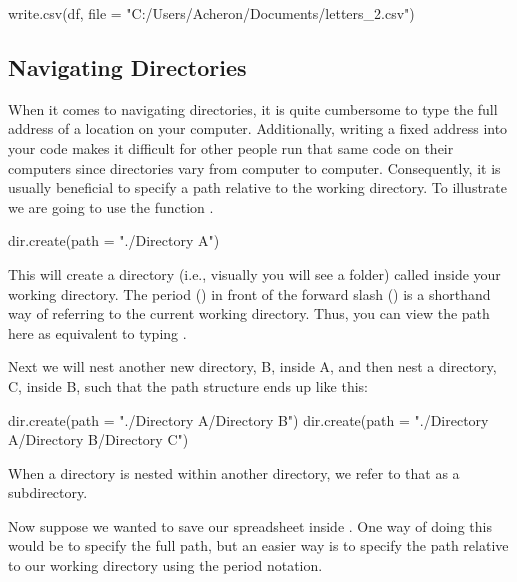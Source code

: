\begin{inR}
write.csv(df, file = "C:/Users/Acheron/Documents/letters_2.csv")
\end{inR}

\vspace{1em}

\subsection{Navigating Directories}

When it comes to navigating directories, it is quite cumbersome to type the full address of a location on your computer. Additionally, writing a fixed address into your code makes it difficult for other people run that same code on their computers since directories vary from computer to computer. Consequently, it is usually beneficial to specify a path relative to the working directory. To illustrate we are going to use the function .

\begin{inR}
dir.create(path = "./Directory A")
\end{inR}

\vspace{1em}

\noindent
This will create a directory (i.e., visually you will see a folder) called  inside your working directory. The period () in front of the forward slash (\R{/}) is a shorthand way of referring to the current working directory. Thus, you can view the path here as equivalent to typing .

Next we will nest another new directory, B, inside A, and then nest a directory, C, inside B, such that the path structure ends up like this:

\vspace{1em}


\begin{inR}
dir.create(path = "./Directory A/Directory B")
dir.create(path = "./Directory A/Directory B/Directory C")
\end{inR}

\medskip
\noindent
When a directory is nested within another directory, we refer to that as a \gls{subdirectory}.

Now suppose we wanted to save our spreadsheet inside . One way of doing this would be to specify the full path, but an easier way is to specify the path relative to our working directory using the period notation.

